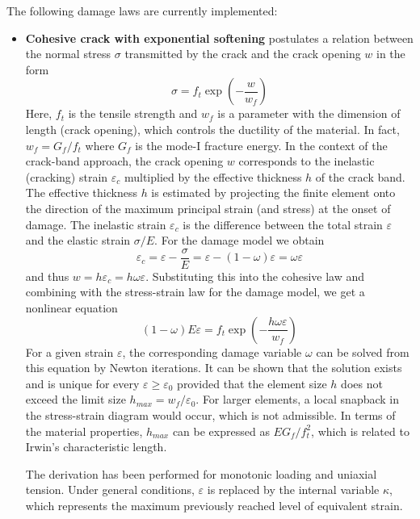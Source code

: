 \documentclass[a4paper]{article}
\begin{document}
The following damage laws are currently implemented:
\begin{itemize}
\item
{\bf Cohesive crack with exponential softening} postulates a relation
between the normal stress $\sigma$ transmitted by the crack and the
crack opening $w$ in the form
$$
\sigma = f_t\exp\left(-\frac{w}{w_f}\right)
$$
Here, $f_t$ is the tensile strength and $w_f$ is a parameter with the dimension
of length (crack opening), which controls the ductility of the material.
In fact, $w_f=G_f/f_t$ where $G_f$ is the mode-I fracture energy.
In the context of the crack-band approach, the crack opening $w$ corresponds
to the inelastic (cracking) strain $\varepsilon_c$ 
multiplied by the effective thickness $h$ of the 
crack band. The effective thickness $h$ is estimated by projecting the finite
element onto the direction of the maximum principal strain (and stress)
at the onset of damage. The inelastic strain $\varepsilon_c$
is the difference between
the total strain $\varepsilon$ and the elastic strain $\sigma/E$.
For the damage model we obtain
$$
\varepsilon_c = \varepsilon - \frac{\sigma}{E} =
\varepsilon - (1-\omega)\varepsilon = \omega\varepsilon
$$
and thus $w=h\varepsilon_c=h\omega\varepsilon$. Substituting this into
the cohesive law and combining with the stress-strain law for the damage
model, we get a nonlinear equation
$$
(1-\omega)E\varepsilon = f_t\exp\left(-\frac{h\omega\varepsilon}{w_f}\right)
$$
For a given strain $\varepsilon$, the corresponding damage variable $\omega$
can be solved from this equation by Newton iterations. 
It can be shown that the solution exists and is unique for every
$\varepsilon\ge\varepsilon_0$ provided that the element size $h$ does not
exceed the limit size $h_{max}=w_f/\varepsilon_0$. For larger elements,
a local snapback in the stress-strain diagram would occur, which is not
admissible. In terms of the material properties, $h_{max}$ can be expressed
as $EG_f/f_t^2$, which is related to Irwin's characteristic length.

The derivation
has been performed for monotonic loading and uniaxial tension. Under general
conditions, $\varepsilon$ is replaced by the internal variable $\kappa$,
which represents the maximum previously reached level of equivalent strain.


\end{itemize}
\end{document}
